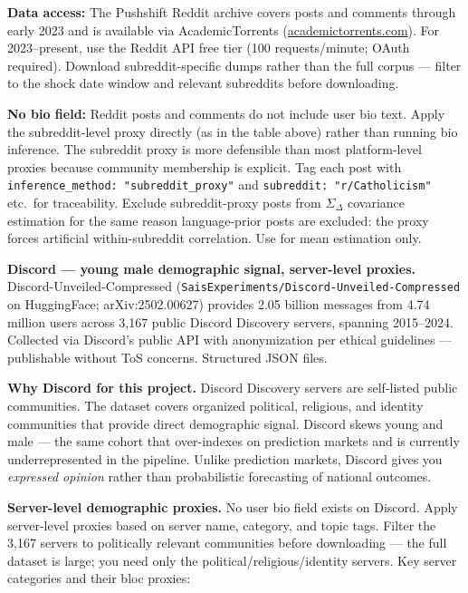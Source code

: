 \documentclass[11pt]{article}
\begin{document}
\textbf{Data access:} The Pushshift Reddit archive covers posts and comments
through early 2023 and is available via AcademicTorrents
(\url{academictorrents.com}). For 2023--present, use the Reddit API free tier
(100 requests/minute; OAuth required). Download subreddit-specific dumps
rather than the full corpus --- filter to the shock date window and relevant
subreddits before downloading.

\textbf{No bio field:} Reddit posts and comments do not include user bio text.
Apply the subreddit-level proxy directly (as in the table above) rather than
running bio inference. The subreddit proxy is more defensible than most
platform-level proxies because community membership is explicit.
Tag each post with \texttt{inference\_method: "subreddit\_proxy"} and
\texttt{subreddit: "r/Catholicism"} etc.\ for traceability.
Exclude subreddit-proxy posts from $\Sigma_\Delta$ covariance estimation for
the same reason language-prior posts are excluded: the proxy forces artificial
within-subreddit correlation. Use for mean estimation only.

\medskip
\noindent\textbf{Discord --- young male demographic signal, server-level proxies.}
Discord-Unveiled-Compressed (\texttt{SaisExperiments/Discord-Unveiled-Compressed} on
HuggingFace; arXiv:2502.00627) provides 2.05 billion messages from 4.74 million users
across 3,167 public Discord Discovery servers, spanning 2015--2024. Collected via
Discord's public API with anonymization per ethical guidelines --- publishable without
ToS concerns. Structured JSON files.

\textbf{Why Discord for this project.}
Discord Discovery servers are self-listed public communities. The dataset covers
organized political, religious, and identity communities that provide direct
demographic signal. Discord skews young and male --- the same cohort that
over-indexes on prediction markets and is currently underrepresented in the
pipeline. Unlike prediction markets, Discord gives you \emph{expressed opinion}
rather than probabilistic forecasting of national outcomes.

\textbf{Server-level demographic proxies.} No user bio field exists on Discord.
Apply server-level proxies based on server name, category, and topic tags.
Filter the 3,167 servers to politically relevant communities before downloading
--- the full dataset is large; you need only the political/religious/identity
servers. Key server categories and their bloc proxies:
\end{document}
